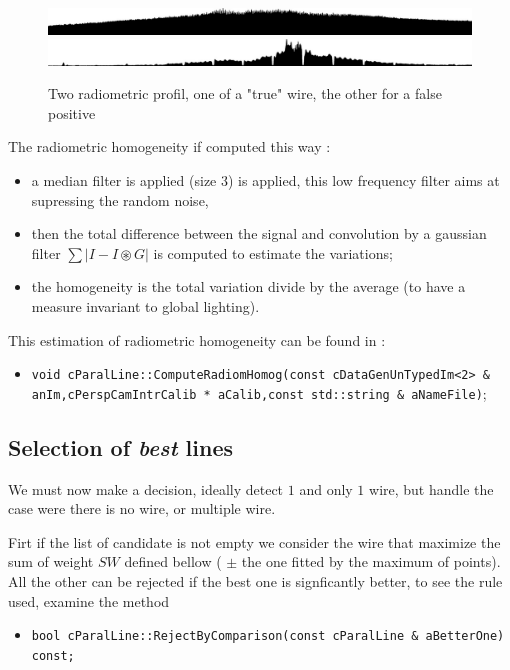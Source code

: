 \begin{figure}
\centering
        \includegraphics[width=14cm]{Methods/ImagesFils/ProfilOK.jpg}
        \includegraphics[width=14cm]{Methods/ImagesFils/ProfilNotOk.jpg}
        \caption{Two radiometric profil, one of a "true" wire, the other for a false positive}
\label{Fig:Line:RadiomProfil}
\end{figure}

The radiometric homogeneity if computed this way :

\begin{itemize}
   \item  a median filter is applied (size $3$) is applied,
          this low frequency filter aims at supressing the random noise,
   \item  then the total difference between the signal and convolution by a gaussian filter $\sum |I-I \circledast G| $ is computed
          to estimate the variations;
   \item  the  homogeneity is the total variation divide by the average (to have a measure
          invariant to global lighting).
\end{itemize}

This estimation of radiometric  homogeneity can be found in :

\begin{itemize}
   \item {\tt void  cParalLine::ComputeRadiomHomog(const cDataGenUnTypedIm<2> \& anIm,cPerspCamIntrCalib * aCalib,const std::string \& aNameFile)};

\end{itemize}


\subsection{Selection of  \emph{best} lines}

We must now make a decision, ideally detect $1$ and only $1$ wire, but handle the case
were there is no wire, or multiple wire.


Firt if the list of candidate is not empty we consider the wire that maximize the sum of weight $SW$
defined bellow ( $\pm$ the one fitted by the maximum of points). All the other can be rejected if 
the best one is signficantly better, to see the rule used, examine the method

\begin{itemize}
   \item  {\tt bool cParalLine::RejectByComparison(const cParalLine \& aBetterOne) const;}
\end{itemize}











